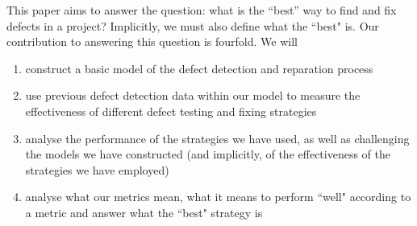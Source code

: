 This paper aims to answer the question: what is the ``best” way to find and fix defects in a project?
Implicitly, we must also define what the ``best" is.
Our contribution to answering this question is fourfold.
We will
\begin{enumerate}
  \item construct a basic model of the defect detection and reparation process
  \item use previous defect detection data within our model to measure the effectiveness of different defect testing and fixing strategies
  \item analyse the performance of the strategies we have used, as well as challenging the models we have constructed (and implicitly, of the effectiveness of the strategies we have employed)
	\item analyse what our metrics mean, what it means to perform ``well" according to a metric and
answer what the ``best" strategy is
\end{enumerate}
